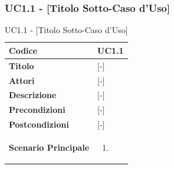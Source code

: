 \subsubsection{UC1.1 - {[Titolo Sotto-Caso d'Uso]}}
\begin{table}[ht]
	\centering
	\renewcommand{\arraystretch}{1.4}
	\begin{tabularx}{\textwidth}{|l|X|}
		\hline
		\textbf{Codice} & \textbf{UC1.1} \\
		\hline
		\textbf{Titolo} & {[-]} \\
		\hline
		\textbf{Attori} & {[-]} \\
		\hline
		\textbf{Descrizione} & {[-]} \\
		\hline
		\textbf{Precondizioni} & {[-]} \\
		\hline
		\textbf{Postcondizioni} & {[-]} \\
		\hline
		\textbf{Scenario Principale} & 
		\vspace{-0.4cm}
		\begin{enumerate}[leftmargin=*]
			\item [-]
		\end{enumerate} \\
		\hline
	\end{tabularx}
	\caption{UC1.1 - {[Titolo Sotto-Caso d'Uso]}}
\end{table}